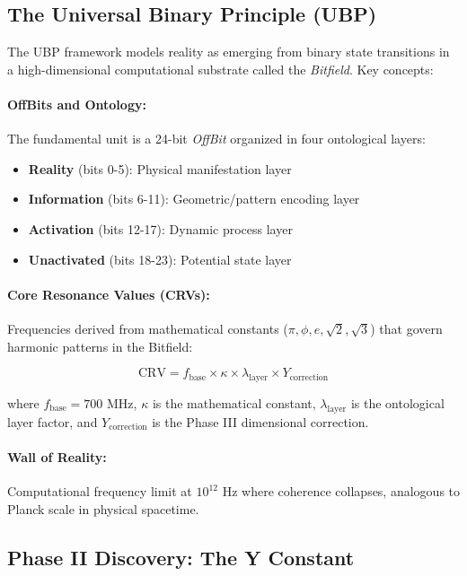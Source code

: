 \documentclass[11pt,a4paper]{article}
\begin{document}
\subsection{The Universal Binary Principle (UBP)}

The UBP framework models reality as emerging from binary state transitions in a high-dimensional computational substrate called the \emph{Bitfield}. Key concepts:

\paragraph{OffBits and Ontology:} The fundamental unit is a 24-bit \emph{OffBit} organized in four ontological layers:
\begin{itemize}
    \item \textbf{Reality} (bits 0-5): Physical manifestation layer
    \item \textbf{Information} (bits 6-11): Geometric/pattern encoding layer
    \item \textbf{Activation} (bits 12-17): Dynamic process layer
    \item \textbf{Unactivated} (bits 18-23): Potential state layer
\end{itemize}

\paragraph{Core Resonance Values (CRVs):} Frequencies derived from mathematical constants ($\pi, \phi, e, \sqrt{2}, \sqrt{3}$) that govern harmonic patterns in the Bitfield:

\begin{equation}
\text{CRV} = f_{\text{base}} \times \kappa \times \lambda_{\text{layer}} \times Y_{\text{correction}}
\label{eq:crv_formula}
\end{equation}

where $f_{\text{base}} = 700$ MHz, $\kappa$ is the mathematical constant, $\lambda_{\text{layer}}$ is the ontological layer factor, and $Y_{\text{correction}}$ is the Phase III dimensional correction.

\paragraph{Wall of Reality:} Computational frequency limit at $10^{12}$ Hz where coherence collapses, analogous to Planck scale in physical spacetime.

\subsection{Phase II Discovery: The Y Constant}
\end{document}
